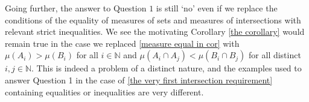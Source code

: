 \documentclass[12pt]{article}
\begin{document}
    Going further, the answer to Question $1$ is still `no' even if we replace the conditions of the equality of measures of sets and measures of intersections with relevant strict inequalities. We see the motivating Corollary \ref{the corollary} would remain true in the case we replaced \eqref{measure equal in cor} with $\mu(A_i)>\mu(B_i) $ for all $i \in \mathbb{N}$ and $\mu(A_i \cap A_j) <\mu(B_i \cap B_j)$ for all distinct $i,j \in \mathbb{N}$. This is indeed a problem of a distinct nature, and the examples used to answer Question 1 in the case of \eqref{the very first intersection requirement} containing equalities or inequalities are very different.
    





\end{document}

